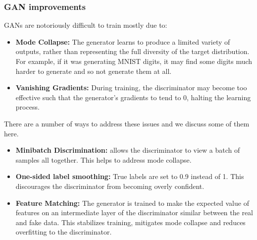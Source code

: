 \documentclass[12pt]{report}
\begin{document}
\subsubsection{GAN improvements}

GANs are notoriously difficult to train \citep{goodfellow2014GAN, salimans2016improved} mostly due to:

\begin{itemize}
    \item \textbf{Mode Collapse:} The generator learns to produce a limited variety of outputs, rather than representing the full diversity of the target distribution. For example, if it was generating MNIST digits, it may find some digits much harder to generate and so not generate them at all. 
    \item \textbf{Vanishing Gradients:} During training, the discriminator may become too effective such that the generator's gradients to tend to 0, halting the learning process.
\end{itemize}

There are a number of ways to address these issues and we discuss some of them here. 

\begin{itemize}
    \item \textbf{Minibatch Discrimination:} allows the discriminator to view a batch of samples all together. This helps to address mode collapse. \cite{salimans2016improved}
    \item \textbf{One-sided label smoothing:} True labels are set to 0.9 instead of 1. This discourages the discriminator from becoming overly confident. \cite{salimans2016improved}
    \item \textbf{Feature Matching:} The generator is trained to make the expected value of features on an intermediate layer of the discriminator similar between the real and fake data. This stabilizes training,  mitigates mode collapse and reduces overfitting to the discriminator. 
\end{itemize}
\end{document}
